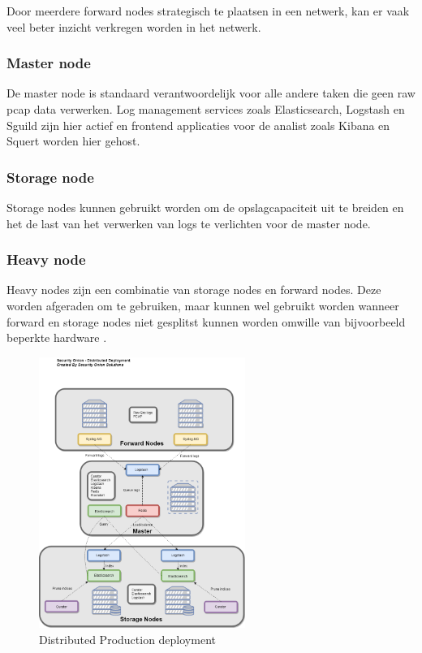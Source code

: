\documentclass[a4paper,12pt]{report}
\begin{document}
Door meerdere forward nodes strategisch te plaatsen in een netwerk, kan er vaak veel beter inzicht verkregen worden in het netwerk.

\subsubsection{Master node}
De master node is standaard verantwoordelijk voor alle andere taken die geen raw pcap data verwerken.
Log management services zoals Elasticsearch, Logstash en Sguild zijn hier actief en frontend applicaties voor de analist zoals Kibana en Squert worden hier gehost.

\subsubsection{Storage node}
Storage nodes kunnen gebruikt worden om de opslagcapaciteit uit te breiden en het de last van het verwerken van logs te verlichten voor de master node.

\subsubsection{Heavy node}
Heavy nodes zijn een combinatie van storage nodes en forward nodes.
Deze worden afgeraden om te gebruiken, maar kunnen wel gebruikt worden wanneer forward en storage nodes niet gesplitst kunnen worden omwille van bijvoorbeeld beperkte hardware \autocite{so:docs}.

\begin{figure}[H]
  \centering
  \includegraphics[width=0.6\textwidth]{so-architecture-production-distributed}
  \caption{Distributed Production deployment \autocite{so:docs}}
  \label{fig:so-architecture-distributed}
\end{figure}
\end{document}
